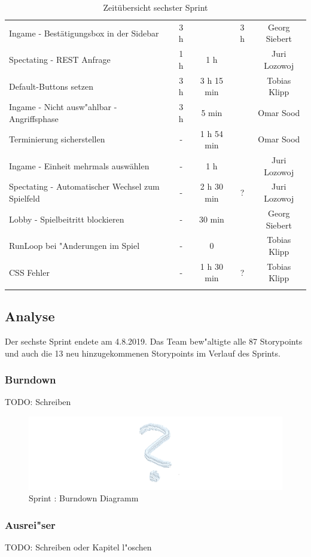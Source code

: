 \documentclass[12pt, titlepage]{scrartcl}
\newcommand{\RN}[1]{%
	\textup{\uppercase\expandafter{\romannumeral#1}}%
}
\begin{document}
\begin{longtable}[H]{p{6cm} c c c c }
    			Ingame - Best\"atigungsbox in der Sidebar & 3 h &  & 3 h & Georg Siebert \\
    			Spectating - REST Anfrage & 1 h & 1 h &  & Juri Lozowoj \\
    			Default-Buttons setzen & 3 h & 3 h 15 min & & Tobias Klipp \\
    			Ingame - Nicht ausw"ahlbar - Angriffsphase & 3 h & 5 min & & Omar Sood \\
    			\midrule
    			Terminierung sicherstellen & - & 1 h 54 min &  & Omar Sood \\
    			Ingame - Einheit mehrmals ausw\"ahlen & - & 1 h &  & Juri Lozowoj \\
    			Spectating - Automatischer Wechsel zum Spielfeld & - & 2 h 30 min & ? & Juri Lozowoj \\
    			Lobby - Spielbeitritt blockieren & - & 30 min &  & Georg Siebert \\
    			RunLoop bei "Anderungen im Spiel & - & 0 &  & Tobias Klipp \\
    			CSS Fehler & - & 1 h 30 min & ? & Tobias Klipp \\
    			\caption{Zeit\"ubersicht sechster Sprint}
    		\end{longtable}
    	\subsection{Analyse}
    		Der sechste Sprint endete am 4.8.2019. Das Team bew"altigte alle 87 Storypoints und auch die 13 neu hinzugekommenen Storypoints im Verlauf des Sprints.
	    	\subsubsection{Burndown}
	    		TODO: Schreiben
	    		\begin{figure}[H] 
	    			\centering
	    			\includegraphics[width=\textwidth]{images/sprintVI/burndown.png}
	    			\caption{Sprint \RN{6}: Burndown Diagramm}
	    			\label{Burndown_6}
	    		\end{figure}
	    	\subsubsection{Ausrei"ser}
	    		TODO: Schreiben oder Kapitel l"oschen
\end{document}
